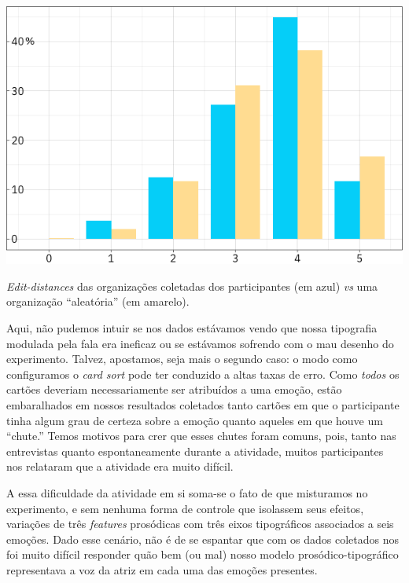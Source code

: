 \documentclass[a4paper]{tufte-handout}
\begin{document}
\begin{marginfigure}[-9\baselineskip]
  \includegraphics{imgs/edit_distance_reais.png}
  \caption{\textit{Edit-distances} das organizações coletadas dos participantes (em azul) \textit{vs} uma organização ``aleatória'' (em amarelo).}
  \label{edit_dist_1}
\end{marginfigure}

Aqui, não pudemos intuir se nos dados estávamos vendo que nossa tipografia modulada pela fala era ineficaz ou se estávamos sofrendo com o mau desenho do experimento. Talvez, apostamos, seja mais o segundo caso: o modo como configuramos o \textit{card sort} pode ter conduzido a altas taxas de erro. Como \textit{todos} os cartões deveriam necessariamente ser atribuídos a uma emoção, estão embaralhados em nossos resultados coletados tanto cartões em que o participante tinha algum grau de certeza sobre a emoção quanto aqueles em que houve um ``chute.'' Temos motivos para crer que esses chutes foram comuns, pois, tanto nas entrevistas quanto espontaneamente durante a atividade, muitos participantes nos relataram que a atividade era muito difícil.

A essa dificuldade da atividade em si soma-se o fato de que misturamos no experimento, e sem nenhuma forma de controle que isolassem seus efeitos, variações de três \textit{features} prosódicas com três eixos tipográficos associados a seis emoções. Dado esse cenário, não é de se espantar que com os dados coletados nos foi muito difícil responder quão bem (ou mal) nosso modelo prosódico-tipográfico representava a voz da atriz em cada uma das emoções presentes. 
\end{document}
